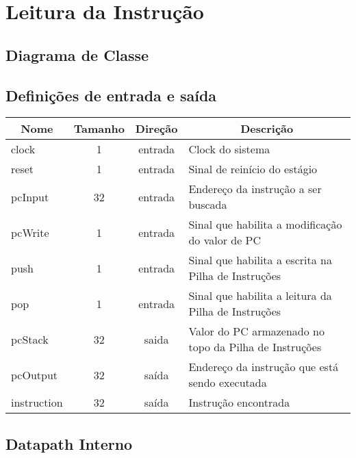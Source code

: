 \section{Leitura da Instrução}
	\subsection{Diagrama de Classe}
  \begin{figure}[h!]
    
  \end{figure}
		
		\subsection{Definições de entrada e saída}
		
	\begin{center}
		\begin{longtable}[pos]{| l | c | c | m{7cm} |} \hline
			\multicolumn{1}{|c|}{\cellcolor[gray]{0.9}\textbf{Nome}} & 
			\multicolumn{1}{c|}{\cellcolor[gray]{0.9}\textbf{Tamanho}} & 
			\multicolumn{1}{c|}{\cellcolor[gray]{0.9}\textbf{Direção}} &
			\multicolumn{1}{c|}{\cellcolor[gray]{0.9}\textbf{Descrição}} \\ \hline
			\endhead
			\hline
			\endlastfoot
			clock & 1 & entrada & Clock do sistema \\ \hline
			reset & 1 & entrada & Sinal de reinício do estágio\\ \hline
			pcInput & 32 & entrada & Endereço da instrução a ser buscada \\ \hline
			pcWrite & 1 & entrada & Sinal que habilita a modificação do valor de PC \\ \hline
			push & 1 & entrada & Sinal que habilita a escrita na Pilha de Instruções\\ \hline
			pop & 1 & entrada & Sinal que habilita a leitura da Pilha de Instruções\\ \hline
			pcStack & 32 & saida & Valor do PC armazenado no topo da Pilha de Instruções\\ \hline
			pcOutput & 32 & saída & Endereço da instrução que está sendo executada \\ \hline
			instruction & 32 & saída & Instrução encontrada \\ \hline
			
		\end{longtable}
	\end{center}
	
	
	\subsection{Datapath Interno}
	\begin{figure}[htpb!]
		\begin{center}
		\end{center}
	\end{figure}
	